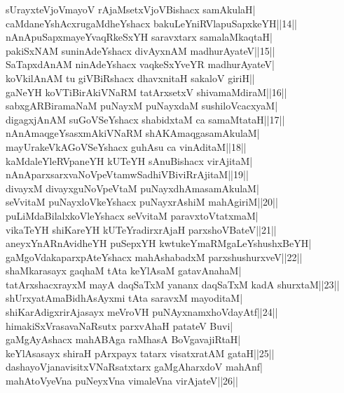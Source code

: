 \documentclass{article}
\begin{document}
sUrayxteVjoVmayoV rAjaMsetxVjoVBishacx samAkulaH|\\
caMdaneYshAcxrugaMdheYshacx bakuLeYniRVlapuSapxkeYH||14||\\
nAnApuSapxmayeYvaqRkeSxYH saravxtarx samalaMkaqtaH|\\
pakiSxNAM suninAdeYshacx divAyxnAM madhurAyateV||15||\\
SaTapxdAnAM ninAdeYshacx vaqkeSxYveYR madhurAyateV|\\
koVkilAnAM tu giVBiRshacx dhavxnitaH sakaloV giriH||\\
gaNeYH koVTiBirAkiVNaRM tatArxsetxV shivamaMdiraM||16||\\
sabxgARBiramaNaM puNayxM puNayxdaM sushiloVcacxyaM|\\
digagxjAnAM suGoVSeYshacx shabidxtaM ca samaMtataH||17||\\
nAnAmaqgeYsasxmAkiVNaRM shAKAmaqgasamAkulaM|\\
mayUrakeVkAGoVSeYshacx guhAsu ca vinAditaM||18||\\
kaMdaleYleRVpaneYH kUTeYH sAnuBishacx virAjitaM|\\
nAnAparxsarxvaNoVpeVtamwSadhiVBiviRrAjitaM||19||\\
divayxM divayxguNoVpeVtaM puNayxdhAmasamAkulaM|\\
seVvitaM puNayxloVkeYshacx puNayxrAshiM mahAgiriM||20||\\
puLiMdaBilalxkoVleYshacx seVvitaM paravxtoVtatxmaM|\\
vikaTeYH shiKareYH kUTeYradirxrAjaH parxshoVBateV||21||\\
aneyxYnARnAvidheYH puSepxYH kwtukeYmaRMgaLeYshushxBeYH|\\
gaMgoVdakaparxpAteYshacx mahAshabadxM parxshushurxveV||22||\\
shaMkarasayx gaqhaM tAta keYlAsaM gatavAnahaM|\\
tatArxshacxrayxM mayA daqSaTxM yananx daqSaTxM kadA shurxtaM||23||\\
shUrxyatAmaBidhAsAyxmi tAta saravxM mayoditaM|\\
shiKarAdigxrirAjasayx meVroVH puNAyxnamxhoVdayAtf||24||\\
himakiSxVrasavaNaRsutx parxvAhaH patateV Buvi|\\
gaMgAyAshacx mahABAga raMhasA BoVgavajiRtaH|\\
keYlAsasayx shiraH pArxpayx tatarx visatxratAM gataH||25||\\
dashayoVjanavisitxVNaRsatxtarx gaMgAharxdoV mahAnf|\\
mahAtoVyeVna puNeyxVna vimaleVna virAjateV||26||\\
\end{document}
